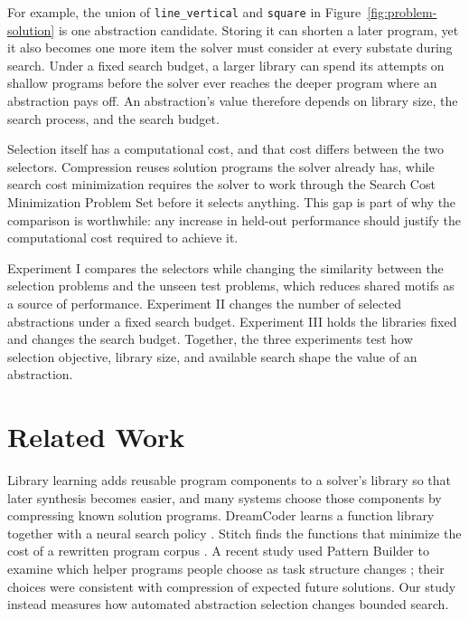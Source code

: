 \documentclass[10pt]{article}
\begin{document}
For example, the union of \texttt{line\_vertical} and \texttt{square} in
Figure~\ref{fig:problem-solution} is one abstraction candidate. Storing it can
shorten a later program, yet it also becomes one more item the solver must
consider at every substate during search. Under a fixed search budget, a
larger library can spend its attempts on shallow programs before the solver
ever reaches the deeper program where an abstraction pays off. An
abstraction's value therefore depends on library size, the search process,
and the search budget.

Selection itself has a computational cost, and that cost differs between
the two selectors.
Compression reuses solution programs the solver already has, while search
cost minimization requires the solver to work through the Search Cost
Minimization Problem Set before it selects anything. This gap is part of why
the comparison is worthwhile: any increase in held-out performance should
justify the computational cost required to achieve it.

Experiment I compares the selectors while changing the similarity between the
selection problems and the unseen test problems, which reduces shared motifs
as a source of performance. Experiment II changes the number of selected
abstractions under a fixed search budget. Experiment III holds the libraries
fixed and changes the search budget. Together, the three experiments test how
selection objective, library size, and available search shape the value of an
abstraction.
\section{Related Work}

Library learning adds reusable program components to a solver's library so
that later synthesis becomes easier, and many systems choose those components
by compressing known solution programs. DreamCoder learns a function library
together with a neural search policy \citep{ellis2021dreamcoder}. Stitch finds
the functions that minimize the cost of a rewritten program corpus
\citep{bowers2023stitch}. A recent study used Pattern Builder to examine which
helper programs people choose as task structure changes
\citep{hernandezcano2026prospective}; their choices were consistent with
compression of expected future solutions. Our study instead measures how
automated abstraction selection changes bounded search.
\end{document}
